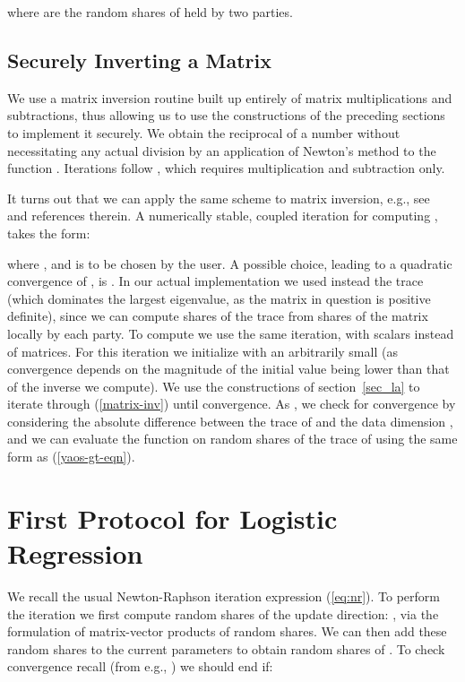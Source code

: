 \documentclass[11pt]{article}
\begin{document}
\noindent where  are the random shares of  held by two parties.

\subsection{Securely Inverting a Matrix}\label{sec:matrix_inversion}

We use a matrix inversion routine  built up entirely of matrix multiplications and subtractions, thus allowing us to use the constructions of the preceding sections to implement it securely. We obtain the reciprocal of a number   without necessitating any actual division  by an application of Newton's method to the function . Iterations follow , which requires multiplication and subtraction only.

It turns out that we can apply the same scheme   to matrix inversion,  e.g.,  see~\cite{guo_higham} and references therein. A numerically stable, coupled iteration for computing , takes the form:

where , and  is to be chosen by the user. A possible choice, leading to a quadratic convergence of  , is . In our actual implementation we used instead the trace (which dominates the largest eigenvalue, as the matrix in question is positive definite), since we can compute shares of the trace from shares of the matrix locally by each party. To compute  we use the same iteration, with scalars instead of matrices.  For this iteration we initialize with an arbitrarily small  (as convergence depends on the magnitude of the initial value being lower than that of the inverse we compute).  We use the constructions of section~\ref{sec_la} to iterate through (\ref{matrix-inv}) until convergence. As , we check for convergence by considering the absolute difference between the trace of  and the data dimension , and we can evaluate the function  on random shares of the trace of  using the same form as (\ref{yaos-gt-eqn}).






\section{First Protocol for Logistic Regression}\label{sec:protocol1}


We recall the usual Newton-Raphson iteration expression (\ref{eq:nr}). 
To perform the iteration  we first  compute random shares of the update direction: ,
\noindent via the formulation of matrix-vector products of random shares.  We can then add these random shares to the current parameters  to obtain random shares of .  To check convergence recall (from e.g., \cite{cvx_book}) we should end if:
\end{document}
